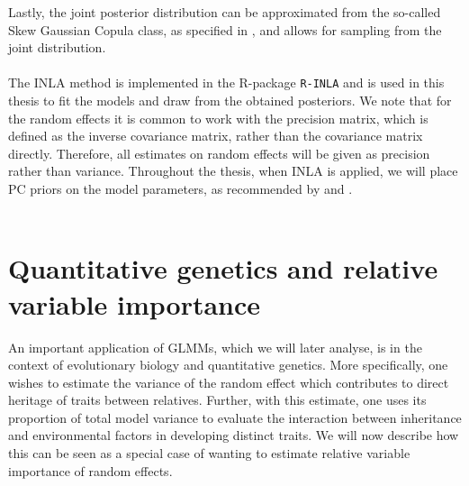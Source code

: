 Lastly, the joint posterior distribution can be approximated from the so-called Skew Gaussian Copula class, as specified in \citet{rue2021joint}, and allows for sampling from the joint distribution.
\\
\\
The INLA method is implemented in the R-package \texttt{R-INLA} \citep{gomezrubio2020inla} and is used in this thesis to fit the models and draw from the obtained posteriors. We note that for the random effects it is common to work with the precision matrix, which is defined as the inverse covariance matrix, rather than the covariance matrix directly. Therefore, all estimates on random effects will be given as precision rather than variance. Throughout the thesis, when INLA is applied, we will place PC priors on the model parameters, as recommended by \citet{simpson2017penalising} and \citet{gomezrubio2020inla}.
\\ 
\\

\section{Quantitative genetics and relative variable importance}
\label{sec:animalmodel}
An important application of GLMMs, which we will later analyse, is in the context of evolutionary biology and quantitative genetics. More specifically, one wishes to estimate the variance of the random effect which contributes to direct heritage of traits between relatives. Further, with this estimate, one uses its proportion of total model variance to evaluate the interaction between inheritance and environmental factors in developing distinct traits.
We will now describe how this can be seen as a special case of wanting to estimate relative variable importance of random effects.
